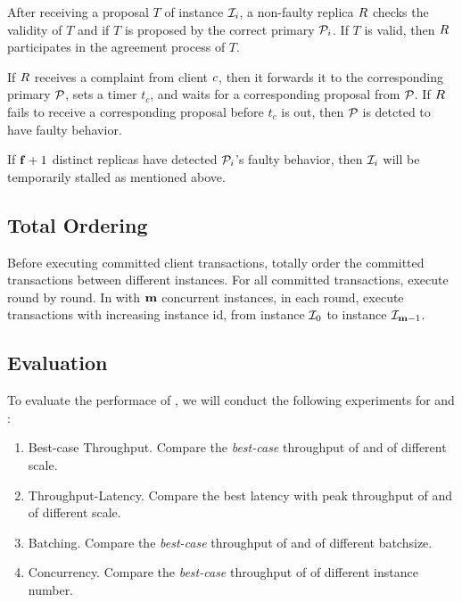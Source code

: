 \par After receiving a proposal $T$ of instance $\mathcal{I}_{i}$, a non-faulty replica $\Replica{}$ 
checks the validity of $T$ and if $T$ is proposed by the correct primary $\mathcal{P}_{i}$. If $T$ is valid, 
then $\Replica{}$ participates in the \PBFT{} agreement process of $T$.

\par If $\Replica{}$ receives a complaint from client $\Client{}$, then it forwards it to the corresponding 
primary $\mathcal{P}_{}$, sets a timer $t_c$, and waits for a corresponding proposal from $\mathcal{P}_{}$. If $\Replica{}$ 
fails to receive a corresponding proposal before $t_c$ is out, then $\mathcal{P}_{}$ is detcted to have faulty behavior. 

\par If $\mathbf{f}+1$ distinct replicas have detected $\mathcal{P}_{i}$'s faulty behavior, then $\mathcal{I}_{i}$ will be temporarily 
stalled as mentioned above.

\subsection{Total Ordering}

\par Before executing committed client transactions, \RCC{} totally order the committed transactions between different 
instances. For all committed transactions, \RCC{} execute round by round. In \RCC{} with $\mathbf{m}$ concurrent instances, in 
each round, \RCC{} execute transactions with increasing instance id, from instance $\mathcal{I}_{0}$ to instance $\mathcal{I}_{\mathbf{m}-1}$.

\subsection{Evaluation}

\par To evaluate the performace of \RCC{}, we will conduct the following experiments for \RCC{} and \PBFT{}:

\begin{enumerate}
    \item Best-case Throughput. Compare the \emph{best-case} throughput of \RCC{} and \PBFT{} of different scale.
    \item Throughput-Latency. Compare the best latency with peak throughput of \RCC{} and \PBFT{} of different scale.
    \item Batching. Compare the \emph{best-case} throughput of \RCC{} and \PBFT{} of different batchsize.
    \item Concurrency. Compare the \emph{best-case} throughput of \RCC{} of different instance number.
\end{enumerate}